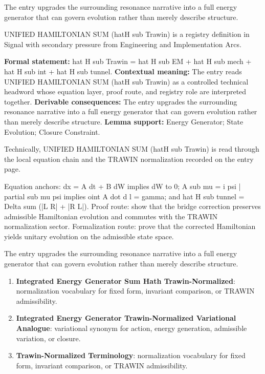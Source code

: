 The entry upgrades the surrounding resonance narrative into a full energy generator that can govern evolution rather than merely describe structure.
\clearpage


\begingroup\small
{}
UNIFIED HAMILTONIAN SUM (hatH sub Trawin) is a registry definition in Signal with secondary pressure from Engineering and Implementation Arcs.

\begingroup\footnotesize\setlength{\emergencystretch}{3em}\sloppy
\textbf{Formal statement:} hat H sub Trawin = hat H sub EM + hat H sub mech + hat H sub int + hat H sub tunnel. \textbf{Contextual meaning:} The entry reads UNIFIED HAMILTONIAN SUM (hatH sub Trawin) as a controlled technical headword whose equation layer, proof route, and registry role are interpreted together. \textbf{Derivable consequences:} The entry upgrades the surrounding resonance narrative into a full energy generator that can govern evolution rather than merely describe structure. \textbf{Lemma support:} Energy Generator; State Evolution; Closure Constraint.\par
\endgroup

Technically, UNIFIED HAMILTONIAN SUM (hatH sub Trawin) is read through the local equation chain and the TRAWIN normalization recorded on the entry page.

Equation anchors: dx = A dt + B dW implies dW to 0; A sub mu = i psi | partial sub mu psi implies oint A dot d l = gamma; and hat H sub tunnel = Delta sum (|L R| + |R L|). Proof route: show that the bridge correction preserves admissible Hamiltonian evolution and commutes with the TRAWIN normalization sector. Formalization route: prove that the corrected Hamiltonian yields unitary evolution on the admissible state space.

The entry upgrades the surrounding resonance narrative into a full energy generator that can govern evolution rather than merely describe structure.
\endgroup

\begin{enumerate}[leftmargin=1.6em,itemsep=6pt,topsep=4pt]
\item \textbf{Integrated Energy Generator Sum Hath Trawin-Normalized}: normalization vocabulary for fixed form, invariant comparison, or TRAWIN admissibility.
\item \textbf{Integrated Energy Generator Trawin-Normalized Variational Analogue}: variational synonym for action, energy generation, admissible variation, or closure.
\item \textbf{Trawin-Normalized Terminology}: normalization vocabulary for fixed form, invariant comparison, or TRAWIN admissibility.
\end{enumerate}


